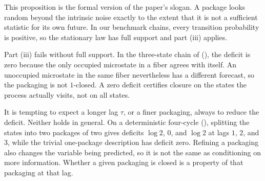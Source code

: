 This proposition is the formal version of the paper's slogan. A package looks random beyond the intrinsic noise exactly to the extent that it is not a sufficient statistic for its own future. In our benchmark chains, every transition probability is positive, so the stationary law has full support and part (iii) applies.

\begin{remark}\label{rem:support}
Part (iii) fails without full support. In the three-state chain of  (), the deficit is zero because the only occupied microstate in a fiber agrees with itself. An unoccupied microstate in the same fiber nevertheless has a different forecast, so the packaging is not $1$-closed. A zero deficit certifies closure on the states the process actually visits, not on all states.
\end{remark}

\begin{remark}\label{rem:nonmonotone}
It is tempting to expect a longer lag $\tau$, or a finer packaging, always to reduce the deficit. Neither holds in general. On a deterministic four-cycle (), splitting the states into two packages of two gives deficits $\log 2$, $0$, and $\log 2$ at lags $1$, $2$, and $3$, while the trivial one-package description has deficit zero. Refining a packaging also changes the variable being predicted, so it is not the same as conditioning on more information. Whether a given packaging is closed is a property of that packaging at that lag.
\end{remark}

